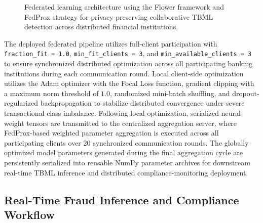 \documentclass[conference]{IEEEtran}
\begin{document}
\begin{figure}[t]
{
}
\caption{Federated learning architecture using the Flower framework and FedProx strategy for privacy-preserving collaborative TBML detection across distributed financial institutions.}
\label{fig:federated_architecture}
\end{figure}

The deployed federated pipeline utilizes full-client participation with \texttt{fraction\_fit = 1.0}, \texttt{min\_fit\_clients = 3}, and \texttt{min\_available\_clients = 3} to ensure synchronized distributed optimization across all participating banking institutions during each communication round. Local client-side optimization utilizes the Adam optimizer with the Focal Loss function, gradient clipping with a maximum norm threshold of \(1.0\), randomized mini-batch shuffling, and dropout-regularized backpropagation to stabilize distributed convergence under severe transactional class imbalance. Following local optimization, serialized neural weight tensors are transmitted to the centralized aggregation server, where FedProx-based weighted parameter aggregation is executed across all participating clients over 20 synchronized communication rounds. The globally optimized model parameters generated during the final aggregation cycle are persistently serialized into reusable NumPy parameter archives for downstream real-time TBML inference and distributed compliance-monitoring deployment.
\subsection{\textbf{Real-Time Fraud Inference and Compliance Workflow}}
\end{document}
